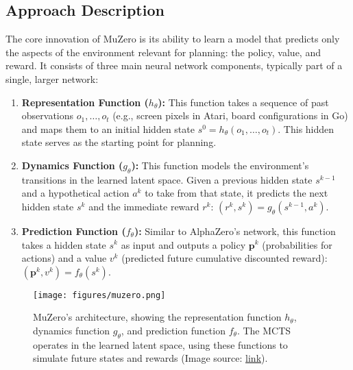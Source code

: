 \documentclass[11pt,a4paper]{article}
\begin{document}
\subsection{Approach Description}
The core innovation of MuZero is its ability to learn a model that predicts only the aspects of the environment relevant for planning: the policy, value, and reward. It consists of three main neural network components, typically part of a single, larger network:
\begin{enumerate}
    \item \textbf{Representation Function ($h_{\theta}$):} This function takes a sequence of past observations $o_1, \dots, o_t$ (e.g., screen pixels in Atari, board configurations in Go) and maps them to an initial hidden state $s^0 = h_{\theta}(o_1, \dots, o_t)$. This hidden state serves as the starting point for planning.
    \item \textbf{Dynamics Function ($g_{\theta}$):} This function models the environment's transitions in the learned latent space. Given a previous hidden state $s^{k-1}$ and a hypothetical action $a^k$ to take from that state, it predicts the next hidden state $s^k$ and the immediate reward $r^k$: $(r^k, s^k) = g_{\theta}(s^{k-1}, a^k)$.
    \item \textbf{Prediction Function ($f_{\theta}$):} Similar to AlphaZero's network, this function takes a hidden state $s^k$ as input and outputs a policy $\mathbf{p}^k$ (probabilities for actions) and a value $v^k$ (predicted future cumulative discounted reward): $(\mathbf{p}^k, v^k) = f_{\theta}(s^k)$.
\end{enumerate}

\begin{figure}
    \centering
    \texttt{[image: figures/muzero.png]}
    \caption{MuZero's architecture, showing the representation function $h_{\theta}$, dynamics function $g_{\theta}$, and prediction function $f_{\theta}$. The MCTS operates in the learned latent space, using these functions to simulate future states and rewards (Image source: \href{https://www.furidamu.org/blog/2020/12/22/muzero-intuition/}{link}).}
    \label{fig:muzero_architecture}
\end{figure}
\end{document}
